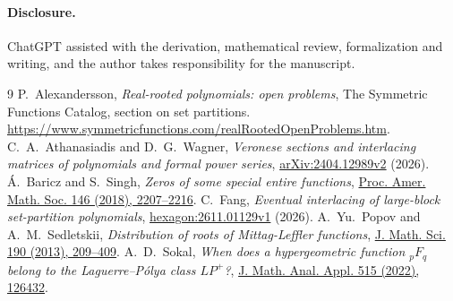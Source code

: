 \documentclass[11pt]{amsart}
\begin{document}
\paragraph{Disclosure.}
ChatGPT assisted with the derivation, mathematical review, formalization
and writing, and the author takes responsibility for the manuscript.

\begin{thebibliography}{9}
 P.~Alexandersson, \emph{Real-rooted polynomials:
open problems}, The Symmetric Functions Catalog, section on set partitions.
\url{https://www.symmetricfunctions.com/realRootedOpenProblems.htm}.
 C.~A.~Athanasiadis and D.~G.~Wagner, \emph{Veronese sections
and interlacing matrices of polynomials and formal power series},
\href{https://arxiv.org/abs/2404.12989v2}{arXiv:2404.12989v2} (2026).
 \'A.~Baricz and S.~Singh, \emph{Zeros of some special entire functions},
\href{https://doi.org/10.1090/proc/13927}{Proc. Amer. Math. Soc. 146 (2018), 2207--2216}.
 C.~Fang, \emph{Eventual interlacing of large-block
set-partition polynomials},
\href{https://hexagonmath.org/2611.01129v1}{hexagon:2611.01129v1} (2026).
 A.~Yu.~Popov and A.~M.~Sedletskii,
\emph{Distribution of roots of Mittag-Leffler functions},
\href{https://doi.org/10.1007/s10958-013-1255-3}{J. Math. Sci. 190 (2013), 209--409}.
 A.~D.~Sokal, \emph{When does a hypergeometric function
\({}_pF_q\) belong to the Laguerre--P\'olya class $LP^+$?},
\href{https://doi.org/10.1016/j.jmaa.2022.126432}{J. Math. Anal. Appl. 515 (2022), 126432}.
\end{thebibliography}
\end{document}
